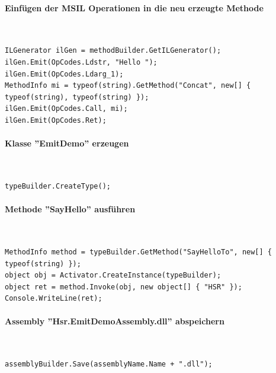 \documentclass[
a4paper,
oneside,
10pt,
fleqn,
headsepline,
toc=listofnumbered, 
bibliography=totocnumbered]{scrartcl}
\let\stdsection\section
\renewcommand\section{\clearpage\stdsection}
\begin{document}
\paragraph{Einfügen der MSIL Operationen in die neu erzeugte Methode}\mbox{} \\
\begin{lstlisting}
ILGenerator ilGen = methodBuilder.GetILGenerator();
ilGen.Emit(OpCodes.Ldstr, "Hello ");
ilGen.Emit(OpCodes.Ldarg_1);
MethodInfo mi = typeof(string).GetMethod("Concat", new[] { typeof(string), typeof(string) });
ilGen.Emit(OpCodes.Call, mi);
ilGen.Emit(OpCodes.Ret);
\end{lstlisting}

\paragraph{Klasse ''EmitDemo'' erzeugen}\mbox{} \\
\begin{lstlisting}
typeBuilder.CreateType();
\end{lstlisting}

\paragraph{Methode ''SayHello'' ausführen}\mbox{} \\
\begin{lstlisting}
MethodInfo method = typeBuilder.GetMethod("SayHelloTo", new[] { typeof(string) });
object obj = Activator.CreateInstance(typeBuilder);
object ret = method.Invoke(obj, new object[] { "HSR" });
Console.WriteLine(ret);
\end{lstlisting}

\paragraph{Assembly ''Hsr.EmitDemoAssembly.dll'' abspeichern}\mbox{} \\
\begin{lstlisting}
assemblyBuilder.Save(assemblyName.Name + ".dll");
\end{lstlisting}


\end{document}

